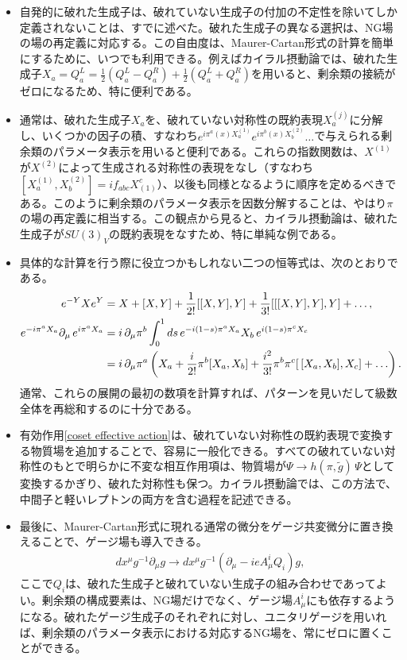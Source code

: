 \begin{itemize} 
	\item 自発的に破れた生成子は、破れていない生成子の付加の不定性を除いてしか定義されないことは、すでに述べた。破れた生成子の異なる選択は、NG場の場の再定義に対応する。この自由度は、Maurer-Cartan形式の計算を簡単にするために、いつでも利用できる。例えばカイラル摂動論では、破れた生成子$X_a = Q_a^L = \tfrac{1}{2} (Q_a^L - Q_a^R) + \tfrac{1}{2} (Q_a^L + Q_a^R)$を用いると、剰余類の接続がゼロになるため、特に便利である。
	\item 通常は、破れた生成子$X_a$を、破れていない対称性の既約表現$X_a^{(j)}$に分解し、いくつかの因子の積、すなわち$e^{i \pi^a(x) X_a^{(1)}} e^{i \pi^b(x) X_b^{(2)}} \dots$で与えられる剰余類のパラメータ表示を用いると便利である。これらの指数関数は、$X^{(1)}$が$X^{(2)}$によって生成される対称性の表現をなし（すなわち$[ X_a^{(1)},  X_b^{(2)} ] = i f_{abc}  X^c_{(1)}$）、以後も同様となるように順序を定めるべきである。このように剰余類のパラメータ表示を因数分解することは、やはり$\pi$の場の再定義に相当する。この観点から見ると、カイラル摂動論は、破れた生成子が$SU(3)_V$の既約表現をなすため、特に単純な例である。
	\item 具体的な計算を行う際に役立つかもしれない二つの恒等式は、次のとおりである。
	\begin{subequations}
	\begin{align}
	e^{-Y} X e^Y &= X + [X,Y] +\frac{1}{2!}  [[X,Y],Y] +\frac{1}{3!}  [[[X,Y],Y] ,Y] + \dots ,\\
	e^{- i\pi^a X_a} \d_\mu  \, e^{i \pi^a X_a} &=  i \, \partial_\mu \pi^b \int_0^1 ds \, e^{-i (1-s)\pi^a X_a} X_b \, e^{i (1-s)\pi^c X_c} \\
	&= i \, \d_\mu \pi^a \l(X_a + \frac{i }{2!} \pi^b [X_a, X_b] + \frac{i^2}{3!}  \pi^b \pi^c [ \, [X_a, X_b], X_c] + \dots \r) .
	\end{align}
	\end{subequations}
	通常、これらの展開の最初の数項を計算すれば、パターンを見いだして級数全体を再総和するのに十分である。
	\item 有効作用\eqref{coset effective action}は、破れていない対称性の既約表現で変換する物質場を追加することで、容易に一般化できる。すべての破れていない対称性のもとで明らかに不変な相互作用項は、物質場が$\Psi \to h(\pi, \tilde g) \,\Psi$として変換するかぎり、破れた対称性も保つ。カイラル摂動論では、この方法で、中間子と軽いレプトンの両方を含む過程を記述できる。
	\item 最後に、Maurer-Cartan形式に現れる通常の微分をゲージ共変微分に置き換えることで、ゲージ場も導入できる。
	\begin{align}
		d x^\mu g^{-1} \partial_\mu g \to d x^\mu g^{-1} (\partial_\mu - i e A_\mu^i Q_i) g,  
	\end{align}
	ここで$Q_i$は、破れた生成子と破れていない生成子の組み合わせであってよい。剰余類の構成要素は、NG場だけでなく、ゲージ場$ A_\mu^i$にも依存するようになる。破れたゲージ生成子のそれぞれに対し、ユニタリゲージを用いれば、剰余類のパラメータ表示における対応するNG場を、常にゼロに置くことができる。
\end{itemize}
